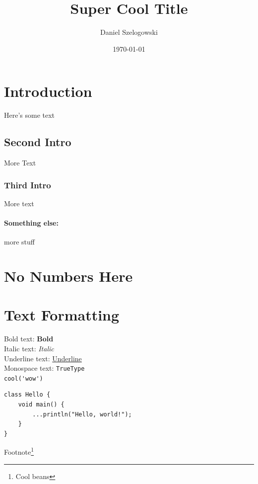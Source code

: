 \documentclass[10pt, letterpaper]{article}  %
\title{Super Cool Title}
\author{Daniel Szelogowski}
\date{\today}
\begin{document}
\maketitle

\tableofcontents
\clearpage  %


\section{Introduction}

Here's some text

\subsection{Second Intro}

More Text

\subsubsection{Third Intro}

More text

\paragraph{Something else:} more stuff




\section*{No Numbers Here}

\section{Text Formatting}

Bold text: \textbf{Bold} \\  %
Italic text: \textit{Italic} \\
Underline text: \underline{Underline} \\
Monospace text: \texttt{TrueType} \\
\quad\quad      \verb|cool('wow')|

\begin{verbatim}
class Hello {
    void main() {
        ...println("Hello, world!");
    }
}
\end{verbatim}

\noindent Footnote\footnote{Cool beans}
\end{document}
